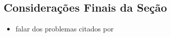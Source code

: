 \subsection{Considerações Finais da Seção}
\begin{itemize}
    \item falar dos problemas citados por \cite{Kirillov2019a}
\end{itemize}
